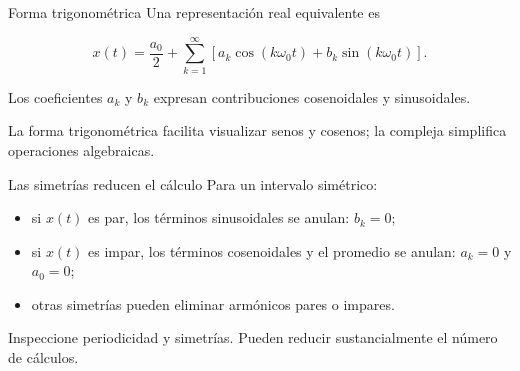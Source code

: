 \documentclass[
  ignorenonframetext,
  aspectratio=169,
  spanish,
  professionalfonts]{beamer}
\providecommand{\tightlist}{%
  \setlength{\itemsep}{0pt}\setlength{\parskip}{0pt}}
\begin{document}
\begin{frame}{Forma trigonométrica}
\protect{}\label{forma-trigonomuxe9trica}
Una representación real equivalente es

\[
x(t)=\frac{a_0}{2}
+\sum_{k=1}^{\infty}
\left[a_k\cos(k\omega_0t)+b_k\sin(k\omega_0t)\right].
\]

Los coeficientes \(a_k\) y \(b_k\) expresan contribuciones cosenoidales
y sinusoidales.

\begin{tcolorbox}[enhanced jigsaw, arc=.35mm, bottomrule=.15mm, bottomtitle=1mm, breakable, colback=white, colbacktitle=quarto-callout-tip-color!10!white, colframe=quarto-callout-tip-color-frame, coltitle=black, left=2mm, leftrule=.75mm, opacityback=0, opacitybacktitle=0.6, rightrule=.15mm, title={Elección de forma}, titlerule=0mm, toprule=.15mm, toptitle=1mm]

La forma trigonométrica facilita visualizar senos y cosenos; la compleja
simplifica operaciones algebraicas.

\end{tcolorbox}
\end{frame}

\begin{frame}{Las simetrías reducen el cálculo}
\protect{}\label{las-simetruxedas-reducen-el-cuxe1lculo}
Para un intervalo simétrico:

\begin{itemize}
\tightlist
\item
  si \(x(t)\) es par, los términos sinusoidales se anulan: \(b_k=0\);
\item
  si \(x(t)\) es impar, los términos cosenoidales y el promedio se
  anulan: \(a_k=0\) y \(a_0=0\);
\item
  otras simetrías pueden eliminar armónicos pares o impares.
\end{itemize}

\begin{tcolorbox}[enhanced jigsaw, arc=.35mm, bottomrule=.15mm, bottomtitle=1mm, breakable, colback=white, colbacktitle=quarto-callout-important-color!10!white, colframe=quarto-callout-important-color-frame, coltitle=black, left=2mm, leftrule=.75mm, opacityback=0, opacitybacktitle=0.6, rightrule=.15mm, title={Antes de integrar}, titlerule=0mm, toprule=.15mm, toptitle=1mm]

Inspeccione periodicidad y simetrías. Pueden reducir sustancialmente el
número de cálculos.

\end{tcolorbox}
\end{frame}
\end{document}
